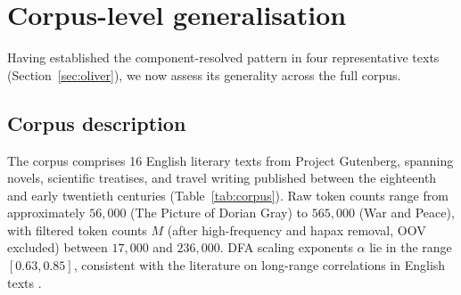 \documentclass[12pt,a4paper]{article}
\newcommand{\NOTE}[1]{\textcolor{blue}{\textbf{[NOTE: #1]}}}
\begin{document}
\FloatBarrier
\section{Corpus-level generalisation}
\label{sec:corpus}

Having established the component-resolved pattern in four
representative texts (Section~\ref{sec:oliver}), we now assess its
generality across the full corpus.
%

\subsection{Corpus description}
\label{sec:corpus_texts}

The corpus comprises 16 English literary texts from Project Gutenberg,
spanning novels, scientific treatises, and travel writing published
between the eighteenth and early twentieth centuries
(Table~\ref{tab:corpus}).
Raw token counts range from approximately $56{,}000$ (The Picture of
Dorian Gray) to $565{,}000$ (War and Peace), with filtered token counts
$M$ (after high-frequency and hapax removal, OOV excluded) between
$17{,}000$ and $236{,}000$.
DFA scaling exponents $\alpha$ lie in the range $[0.63, 0.85]$,
consistent with the literature on long-range correlations in English
texts \citep{Ebeling1995, MontemurroPury2002}.
\end{document}
